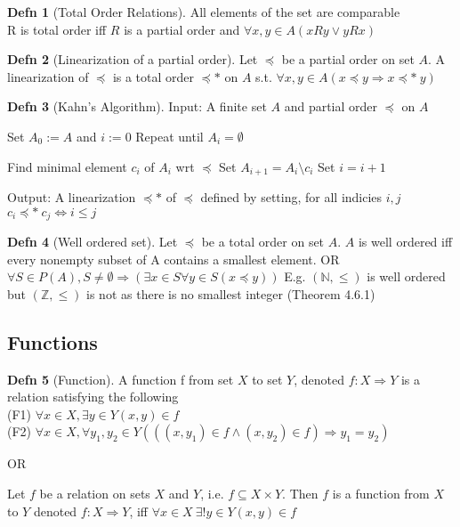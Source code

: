 \documentclass[a4paper]{article}
\theoremstyle{definition}
\newtheorem*{defn}{Defn}
\begin{document}
\begin{defn}[Total Order Relations] All elements of the set are comparable\\
  R is total order iff $R$ is a partial order and $\forall x, y \in A (xRy \lor yRx)$
\end{defn}

\begin{defn}[Linearization of a partial order]
  Let $\preccurlyeq$ be a partial order on set $A$. A linearization of $\preccurlyeq$ is a total order $\preccurlyeq *$ on $A$ s.t. $\forall x, y \in A (x \preccurlyeq y \Rightarrow x \preccurlyeq *\ y)$
\end{defn}

\begin{defn}[Kahn's Algorithm]
  Input: A finite set $A$ and partial order $\preccurlyeq$ on $A$
  \begin{numpf}
  \pfln Set $A_0 := A$ and $i := 0$
  \pfln Repeat until $A_i = \emptyset$
  \begin{subpf}
    \pfln Find minimal element $c_i$ of $A_i$ wrt $\preccurlyeq$ 
    \pfln Set $A_{i+1} = A_i \setminus {c_i}$
    \pfln Set $i = i+1$
  \end{subpf}
  \end{numpf}

  Output: A linearization $\preccurlyeq *$ of $\preccurlyeq$ defined by setting, for all indicies $i, j$\\ $c_i \preccurlyeq*\ c_j \Leftrightarrow i \leq j$
\end{defn}

\begin{defn}[Well ordered set] Let $\preccurlyeq$ be a total order on set $A$. $A$ is well ordered iff every nonempty subset of A contains a smallest element. OR\\
  $\forall S \in P(A), S \not = \emptyset \Rightarrow (\exists x \in S \forall y \in S (x \preccurlyeq y))$ E.g. $(\mathbb{N}, \leq)$ is well ordered but $(\mathbb{Z}, \leq)$ is not as there is no smallest integer (Theorem 4.6.1)

\end{defn}

\subsection*{Functions}
\begin{defn}[Function] A function f from set $X$ to set $Y$, denoted $f: X \Rightarrow Y$ is a relation satisfying the following\\
  (F1) $\forall x \in X, \exists y \in Y (x,y) \in f$\\
  (F2) $\forall x \in X, \forall y_1, y_2 \in Y(((x, y_1) \in f \land (x, y_2) \in f) \Rightarrow y_1 = y_2)$

  OR

  Let $f$ be a relation on sets $X$ and $Y$, i.e. $f \subseteq X \times Y$. Then $f$ is a function from $X$ to $Y$ denoted $f:X \Rightarrow Y$, iff $\forall x \in X\ \exists! y \in Y (x, y) \in f$
\end{defn}
\end{document}

